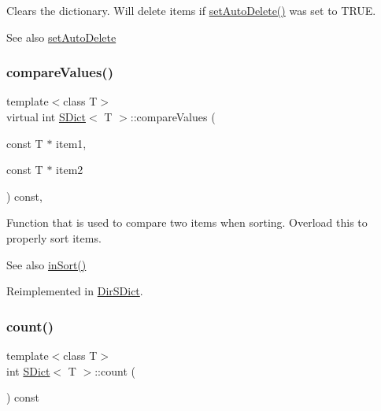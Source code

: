 Clears the dictionary. Will delete items if \mbox{\hyperlink{class_s_dict_ac5ed340a2e6b4b4fb8398254cd35ef55}{set\+Auto\+Delete()}} was set to {\ttfamily T\+R\+UE}. \begin{DoxySeeAlso}{See also}
\mbox{\hyperlink{class_s_dict_ac5ed340a2e6b4b4fb8398254cd35ef55}{set\+Auto\+Delete}} 
\end{DoxySeeAlso}
\mbox{\label{class_s_dict_a10086963aca06a9af9e0e6d75bf49763}} 
\subsubsection{\texorpdfstring{compareValues()}{compareValues()}}
{\footnotesize\ttfamily template$<$class T$>$ \\
virtual int \mbox{\hyperlink{class_s_dict}{S\+Dict}}$<$ T $>$\+::compare\+Values (\begin{DoxyParamCaption}\item[{const T $\ast$}]{item1,  }\item[{const T $\ast$}]{item2 }\end{DoxyParamCaption}) const\hspace{0.3cm}{\ttfamily [inline]}, {\ttfamily [virtual]}}

Function that is used to compare two items when sorting. Overload this to properly sort items. \begin{DoxySeeAlso}{See also}
\mbox{\hyperlink{class_s_dict_a25a85aeba441b4c855ea7be25a4741b5}{in\+Sort()}} 
\end{DoxySeeAlso}


Reimplemented in \mbox{\hyperlink{class_dir_s_dict_a50f500432c67317dec26cac267791005}{Dir\+S\+Dict}}.

\mbox{\label{class_s_dict_a5149795edc957f3bc5af4b536af6d743}} 
\subsubsection{\texorpdfstring{count()}{count()}}
{\footnotesize\ttfamily template$<$class T$>$ \\
int \mbox{\hyperlink{class_s_dict}{S\+Dict}}$<$ T $>$\+::count (\begin{DoxyParamCaption}{ }\end{DoxyParamCaption}) const\hspace{0.3cm}{\ttfamily [inline]}}

